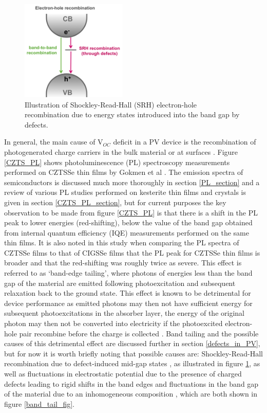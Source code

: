 \begin{figure}[h!]
  \centering
    \includegraphics[width=0.45\textwidth]{figures/SRH.png}
    \caption{Illustration of Shockley-Read-Hall (SRH) electron-hole recombination due to energy states introduced into the band gap by defects.}
  \label{SRH}
\end{figure}

In general, the main cause of V$_{OC}$ deficit in a PV device is the recombination of photogenerated charge carriers in the bulk material or at surfaces \cite{culprit}. 
Figure \ref{CZTS_PL} shows photoluminescence (PL) spectroscopy measurements performed on CZTSSe thin films by Gokmen et al \cite{band_tail}. The emission spectra of semiconductors is discussed much more thoroughly in section \ref{PL_section} and a review of various PL studies performed on kesterite thin films and crystals is given in section \ref{CZTS_PL_section}, but for current purposes the key observation to be made from figure \ref{CZTS_PL} is that there is a shift in the PL peak to lower energies (red-shifting), below the value of the band gap obtained from internal quantum efficiency (IQE) measurements performed on the same thin films. It is also noted in this study when comparing the PL spectra of CZTSSe films to that of CIGSSe films that the PL peak for CZTSSe thin films is broader and that the red-shifting was roughly twice as severe. This effect is referred to as `band-edge tailing', where photons of energies less than the band gap of the material are emitted following photoexcitation and subsequent relaxation back to the ground state. This effect is known to be detrimental for device performance as emitted photons may then not have sufficient energy for subsequent photoexcitations in the absorber layer, the energy of the original photon may then not be converted into electricity if the photoexcited electron-hole pair recombine before the charge is collected \cite{Nelson4}. Band tailing and the possible causes of this detrimental effect are discussed further in section \ref{defects_in_PV}, but for now it is worth briefly noting that possible causes are: Shockley-Read-Hall recombination due to defect-induced mid-gap states \cite{SRH}, as illustrated in figure \ref{SRH}, as well as fluctuations in electrostatic potential due to the presence of charged defects leading to rigid shifts in the band edges and fluctuations in the band gap of the material due to an inhomogeneous composition \cite{band_tail}, which are both shown in figure \ref{band_tail_fig}.

